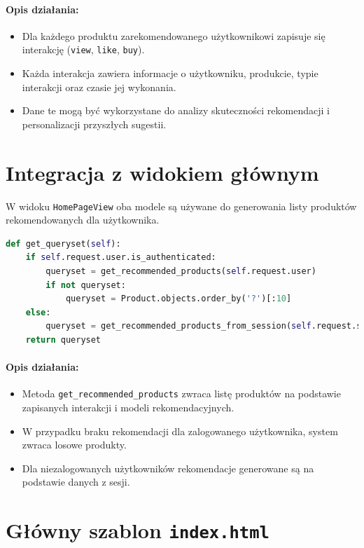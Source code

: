 \documentclass[12pt,a4paper,oneside]{article}
\theoremstyle{definition}
\numberwithin{equation}{section}
\begin{document}
\paragraph{Opis działania:}
\begin{itemize}
    \item Dla każdego produktu zarekomendowanego użytkownikowi zapisuje się interakcję (\texttt{view}, \texttt{like}, \texttt{buy}).
    \item Każda interakcja zawiera informacje o użytkowniku, produkcie, typie interakcji oraz czasie jej wykonania.
    \item Dane te mogą być wykorzystane do analizy skuteczności rekomendacji i personalizacji przyszłych sugestii.
\end{itemize}



\section{Integracja z widokiem głównym}
W widoku \texttt{HomePageView} oba modele są używane do generowania listy produktów rekomendowanych dla użytkownika.

\begin{lstlisting}[language=Python]
def get_queryset(self):
    if self.request.user.is_authenticated:
        queryset = get_recommended_products(self.request.user)
        if not queryset:
            queryset = Product.objects.order_by('?')[:10]
    else:
        queryset = get_recommended_products_from_session(self.request.session)
    return queryset
\end{lstlisting}

\paragraph{Opis działania:}
\begin{itemize}
    \item Metoda \texttt{get\_recommended\_products} zwraca listę produktów na podstawie zapisanych interakcji i modeli rekomendacyjnych.
    \item W przypadku braku rekomendacji dla zalogowanego użytkownika, system zwraca losowe produkty.
    \item Dla niezalogowanych użytkowników rekomendacje generowane są na podstawie danych z sesji.
\end{itemize}

\section{Główny szablon \texttt{index.html}}
\end{document}
